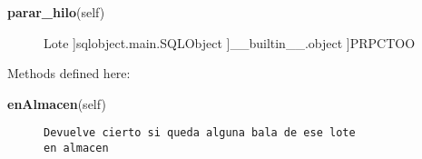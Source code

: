 \begin{description}\item[{\bf parar\_hilo}(self)\end{description}

 \par 


~\\
class {\bf Lote}(sqlobject.main.SQLObject, PRPCTOO)
    
{\tt ~~~}~
\begin{description}\item[Method resolution order:
]Lote
]sqlobject.main.SQLObject
]\_\_builtin\_\_.object
]PRPCTOO
\end{description}

Methods defined here:\\
\begin{description}\item[{\bf enAlmacen}(self)]{\tt Devuelve~cierto~si~queda~alguna~bala~de~ese~lote~\\
en~almacen}\end{description}


